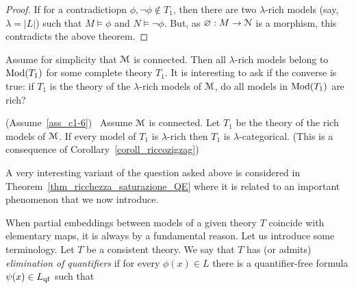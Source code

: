 \begin{proof}
  If for a contradictiopn $\phi,\neg\phi\notin T_1$, then there are two $\lambda$-rich models (say, $\lambda=|L|$) such that $M\models\phi$ and $N\models\neg\phi$.
  But, as $\varnothing:M\to\EuScript N$ is a morphism, this contradicts the above theorem.
\end{proof}

Assume for simplicity that $\EuScript M$ is connected.
Then all $\lambda$-rich models belong to $\mathop{\rm Mod}(T_1)$ for some complete theory $T_1$.
It is interesting to ask if the converse is true: if $T_1$ is the theory of the $\lambda$-rich models of $\EuScript M$, do all models in $\mathop{\rm Mod}(T_1)$ are rich?

\begin{remark}
    (Assume~\ref{ass_c1-6})  \  Assume $\EuScript M$ is connected.
    Let $T_1$ be the theory of the rich models of $\EuScript M$.
    If every model of $T_1$ is $\lambda$-rich then $T_1$ is $\lambda$-categorical.
    (This is a consequence of Corollary~\ref{coroll_riccozigzag})
\end{remark}

A very interesting variant of the question asked above is considered in Theorem~\ref{thm_ricchezza_saturazione_QE} where it is related to an important phenomenon that we now introduce.


When partial embeddings between models of a given theory $T$ coincide with elementary maps, it is always by a fundamental reason.
Let us introduce some terminology.
Let $T$ be a consistent theory.
We say that $T$ has (or admits) \emph{elimination of\/} \emph{quantifiers\/} if for every $\phi(x)\in L$ there is a quantifier-free formula $\psi(x)\in L_{\rm qf}$ such that 


